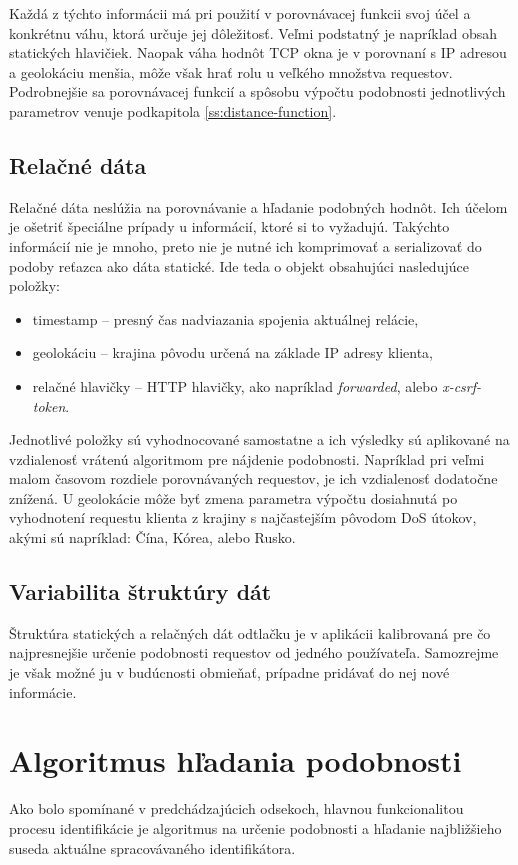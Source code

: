 \documentclass[
  digital, %
  table,   %
  lof,     %
  nolot,   %
  nocover
]{fithesis3}
\begin{document}
Každá z týchto informácii má pri použití v porovnávacej funkcii svoj účel a
konkrétnu váhu, ktorá určuje jej dôležitosť. Veľmi podstatný je napríklad obsah statických hlavičiek. Naopak
váha hodnôt TCP okna je v porovnaní s IP adresou a geolokáciu menšia, môže však
hrať rolu u veľkého množstva requestov. Podrobnejšie sa porovnávacej funkcií a
spôsobu výpočtu podobnosti jednotlivých parametrov venuje podkapitola \ref{ss:distance-function}.

\subsection{Relačné dáta}
Relačné dáta neslúžia na porovnávanie a hľadanie podobných hodnôt. Ich účelom
je ošetriť špeciálne prípady u informácií, ktoré si to vyžadujú. Takýchto
informácií nie je mnoho, preto nie je nutné ich komprimovať a serializovať do podoby reťazca ako
dáta statické.
Ide teda o objekt obsahujúci nasledujúce položky:
\begin{itemize}
    \item timestamp -- presný čas nadviazania spojenia aktuálnej relácie,
    \item geolokáciu -- krajina pôvodu určená na základe IP adresy klienta,
    \item relačné hlavičky -- HTTP hlavičky, ako napríklad
    \textit{forwarded}, alebo \textit{x-csrf-token}. 
\end{itemize}

Jednotlivé položky sú vyhodnocované samostatne a ich výsledky sú aplikované na
vzdialenosť vrátenú algoritmom pre nájdenie podobnosti. Napríklad pri veľmi
malom časovom rozdiele porovnávaných requestov, je ich vzdialenosť dodatočne
znížená. U geolokácie môže byť zmena parametra výpočtu dosiahnutá po vyhodnotení requestu
klienta z krajiny s najčastejším pôvodom DoS útokov, akými sú napríklad: Čína,
Kórea, alebo Rusko.

\subsection{Variabilita štruktúry dát}
Štruktúra statických a relačných dát odtlačku je v aplikácii kalibrovaná
pre čo najpresnejšie určenie podobnosti requestov od jedného používateľa.
Samozrejme je však možné ju v budúcnosti obmieňať, prípadne pridávať do nej
nové informácie.

\section{Algoritmus hľadania podobnosti}
\label{s:similarity-search}
Ako bolo spomínané v predchádzajúcich odsekoch, hlavnou funkcionalitou procesu identifikácie je
algoritmus na určenie podobnosti a hľadanie najbližšieho suseda aktuálne
spracovávaného identifikátora. 
\end{document}
